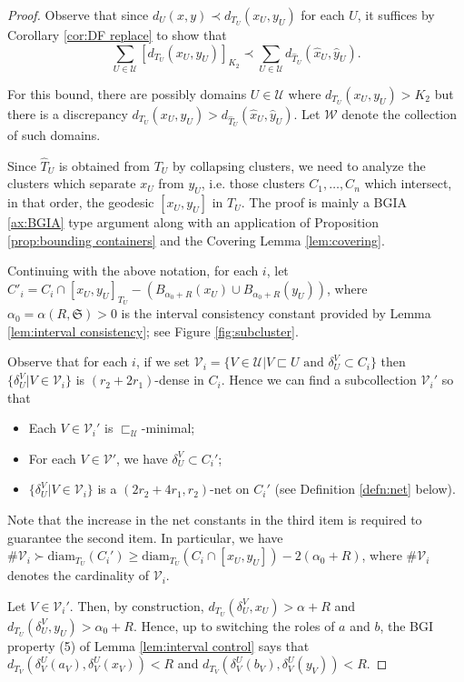 \documentclass{amsart}
\theoremstyle{definition}
\theoremstyle{remark}
\theoremstyle{definition}
\newcommand{\calU}{\mathcal{U}}
\newcommand{\calV}{\mathcal{V}}
\newcommand{\calW}{\mathcal{W}}
\newcommand{\hT}{\widehat{T}}
\newcommand{\hx}{\hat{x}}
\newcommand{\hy}{\hat{y}}
\newcommand{\diam}{\mathrm{diam}}
\newcommand{\nest}{\sqsubset}
\begin{document}
\begin{proof}

Observe that since $d_U(x,y) \prec d_{T_U}(x_U,y_U)$ for each $U$, it suffices by Corollary \ref{cor:DF replace} to show that 
$$\sum_{U \in \calU} [d_{T_U}(x_U,y_U)]_{K_2} \prec \sum_{U \in \calU} d_{\hT_U}(\hx_U,\hy_U).$$

For this bound, there are possibly domains $U \in \calU$ where $d_{T_U}(x_U,y_U) > K_2$ but there is a discrepancy $d_{T_U}(x_U,y_U) > d_{\hT_U}(\hx_U,\hy_U)$.  Let $\calW$ denote the collection of such domains.

Since $\hT_U$ is obtained from $T_U$ by collapsing clusters, we need to analyze the clusters which separate $x_U$ from $y_U$, i.e. those clusters $C_1, \dots, C_n$ which intersect, in that order, the geodesic $[x_U,y_U]$ in $T_U$.  The proof is mainly a BGIA \ref{ax:BGIA} type argument along with an application of Proposition \ref{prop:bounding containers} and the Covering Lemma \ref{lem:covering}.

Continuing with the above notation, for each $i$, let $C'_i = C_i \cap [x_U,y_U]_{T_U} - \left(B_{\alpha_0 + R}(x_U) \cup B_{\alpha_0 + R}(y_U)\right)$, where $\alpha_0 = \alpha(R, \mathfrak S)>0$ is the interval consistency constant provided by Lemma \ref{lem:interval consistency}; see Figure \ref{fig:subcluster}.

Observe that for each $i$, if we set $\calV_i = \{V \in \calU|V \nest U \text{ and } \delta^V_U \subset C_i\}$ then $\{\delta^V_U| V \in \calV_i\}$ is $(r_2 + 2r_1)$-dense in $C_i$.  Hence we can find a subcollection $\calV_i'$ so that
\begin{itemize}
    \item Each $V \in \calV_i'$ is $\nest_{\calU}$-minimal;
    \item For each $V \in \calV'$, we have $\delta^V_U \subset C_i'$;
    \item $\{\delta^V_U| V \in \calV_i\}$ is a $(2r_2+4r_1, r_2)$-net on $C_i'$ (see Definition \ref{defn:net} below).
\end{itemize}

Note that the increase in the net constants in the third item is required to guarantee the second item.  In particular, we have $\#\calV_i \succ \diam_{T_U}(C_i') \geq \diam_{T_U}(C_i \cap [x_U,y_U])- 2(\alpha_0+R)$, where $\#\calV_i$ denotes the cardinality of $\calV_i$.

Let $V \in \calV_i'$.  Then, by construction, $d_{T_U}(\delta^V_U, x_U)> \alpha + R$ and $d_{T_U}(\delta^V_U, y_U)>\alpha_0 + R$.  Hence, up to switching the roles of $a$ and $b$, the BGI property (5) of Lemma \ref{lem:interval control} says that $d_{T_V}(\delta^U_V(a_V),\delta^U_V(x_V))<R$ and $d_{T_V}(\delta^U_V(b_V),\delta^U_V(y_V))<R$. 


\end{proof}
\end{document}
